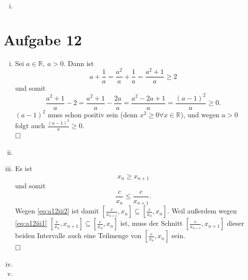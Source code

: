 \documentclass[12pt,a4paper]{article}
\newcommand{\qed}{\null\nobreak\hfill\square}
\begin{document}
\begin{enumerate}[(i)]
    \item
\end{enumerate}


\section*{Aufgabe 12}

\begin{enumerate}[(i)]
    \item Sei $a \in \mathbb{R},\ a > 0$.
    Dann ist
    $$a + \frac{1}{a} = \frac{a^2}{a} + \frac{1}{a} = \frac{a^2 + 1}{a} \geq 2$$
    und somit
    $$\frac{a^2 + 1}{a} -2 = \frac{a^2+1}{a} - \frac{2a}{a} = \frac{a^2 -2a +1}{a} = \frac{(a-1)^2}{a} \geq 0.$$
    $(a-1)^2$ muss schon positiv sein (denn $x^2 \geq 0 \forall x \in \mathbb{R}$), und wegen $a > 0$ folgt auch $\frac{(a-1)^2}{a} \geq 0$.\\
    $\qed$

    \item
    \item Es ist
    \begin{equation}
        \label{eq:a12iii1}
        x_n \geq x_{n+1}
    \end{equation}
    und somit
    \begin{equation}
        \label{eq:a12iii2}
        \frac{c}{x_n} \leq \frac{c}{x_{n+1}}.
    \end{equation}
    Wegen \autoref{eq:a12iii2} ist damit $\left[\frac{c}{x_{n+1}}, x_n\right] \subseteq \left[\frac{c}{x_n}, x_n\right]$.
    Weil außerdem wegen \autoref{eq:a12iii1} $\left[\frac{c}{x_n}, x_{n+1}\right] \subseteq \left[\frac{c}{x_n}, x_n\right]$ ist, muss der Schnitt $\left[\frac{c}{x_{n+1}}, x_{n+1}\right]$ dieser beiden Intervalle auch eine Teilmenge von $\left[\frac{c}{x_n}, x_n\right]$ sein.\\
    $\qed$

    \item
    \item
\end{enumerate}

\end{document}
